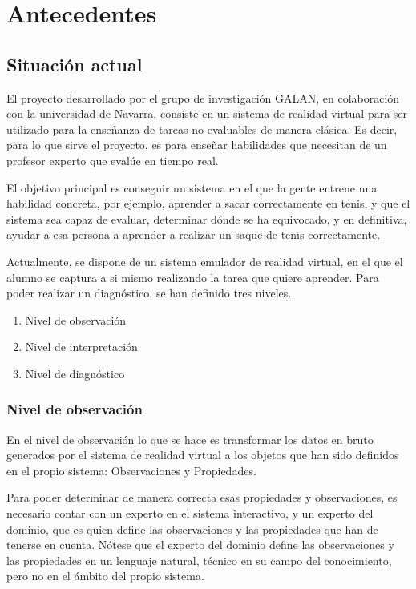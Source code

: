 \chapter{Antecedentes}

\section{Situaci\'on actual}
El proyecto desarrollado por el grupo de investigaci\'on GALAN, en colaboraci\'on con la universidad de Navarra, 
consiste en un sistema de realidad virtual para ser utilizado para la ense\~nanza de tareas no evaluables de manera
cl\'asica. Es decir, para lo que sirve el proyecto, es para ense\~nar habilidades que necesitan de un 
profesor experto que eval\'ue en tiempo real.

El objetivo principal es conseguir un sistema en el que la gente entrene una habilidad concreta, por ejemplo, aprender
a sacar correctamente en tenis, y que el sistema sea capaz de evaluar, determinar d\'onde se ha equivocado, y en definitiva,
ayudar a esa persona a aprender a realizar un saque de tenis correctamente.

Actualmente, se dispone de un sistema emulador de realidad virtual, en el que el alumno se captura a si mismo realizando
la tarea que quiere aprender. Para poder realizar un diagn\'ostico, se han definido tres niveles.

\begin{enumerate}
	\item Nivel de observaci\'on
	\item Nivel de interpretaci\'on
	\item Nivel de diagn\'ostico
\end{enumerate}

\subsection{Nivel de observaci\'on}
En el nivel de observaci\'on lo que se hace es transformar los datos en bruto generados por el sistema de realidad virtual
a los objetos que han sido definidos en el propio sistema: Observaciones y Propiedades.

Para poder determinar de manera correcta esas propiedades y observaciones, es necesario contar con un 
experto en el sistema interactivo, y un experto del dominio, que es quien define las observaciones y las
propiedades que han de tenerse en cuenta. N\'otese que el experto del dominio define las observaciones y las
propiedades en un lenguaje natural, t\'ecnico en su campo del conocimiento, pero no en el \'ambito del propio
sistema.

